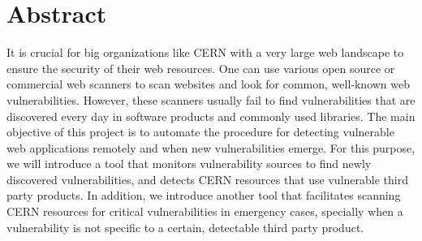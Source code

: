 \chapter*{Abstract}
\thispagestyle{empty}

It is crucial for big organizations like CERN with a very large web landscape to ensure the security of their web resources. One can use various open source or commercial web scanners to scan websites and look for common, well-known web vulnerabilities. However, these scanners usually fail to find vulnerabilities that are discovered every day in software products and commonly used libraries. The main objective of this project is to automate the procedure for detecting vulnerable web applications remotely and when new vulnerabilities emerge. For this purpose, we will introduce a tool that monitors vulnerability sources to find newly discovered vulnerabilities, and detects CERN resources that use vulnerable third party products. In addition, we introduce another tool that facilitates scanning CERN resources for critical vulnerabilities in emergency cases, specially when a vulnerability is not specific to a certain, detectable third party product.
